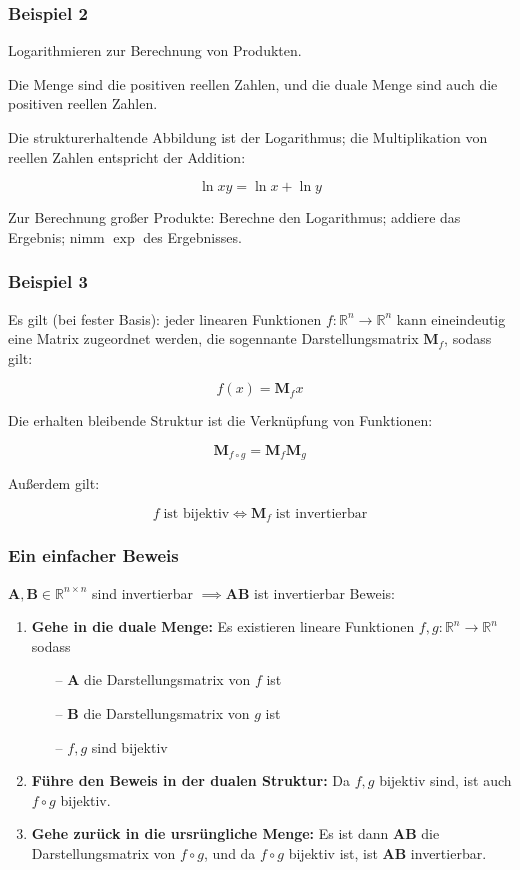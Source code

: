 \documentclass{beamer}
\newcommand{\R}{\mathbb{R}}
\newcommand{\M}{\mathbf{M}}
\newcommand{\A}{\mathbf{A}}
\newcommand{\B}{\mathbf{B}}
\begin{document}
\begin{frame}
\frametitle{Beispiel 2}
Logarithmieren zur Berechnung von Produkten.

Die Menge sind die positiven reellen Zahlen, und die duale Menge sind auch die positiven reellen Zahlen.

Die strukturerhaltende Abbildung ist der Logarithmus; die Multiplikation von reellen Zahlen entspricht der Addition:

$$\ln xy = \ln x + \ln y $$

Zur Berechnung großer Produkte:
Berechne den Logarithmus; addiere das Ergebnis; nimm $\exp$ des Ergebnisses.

\end{frame}

\begin{frame}
\frametitle{Beispiel 3}
Es gilt (bei fester Basis): jeder linearen Funktionen $f: \R^n \to \R^n$ kann eineindeutig eine Matrix zugeordnet werden, die sogennante Darstellungsmatrix $\M_f$, sodass gilt:

$$f(x) = \M_fx$$

Die erhalten bleibende Struktur ist die Verknüpfung von Funktionen:

$$\M_{f \circ g} = \M_f \M_g$$

Außerdem gilt:

$$f \; \text{ist bijektiv} \iff \M_f \; \text{ist invertierbar}$$
\end{frame}

\begin{frame}
\frametitle{Ein einfacher Beweis}
$\A, \B \in \R^{n \times n}$ sind invertierbar $\implies \A \B$ ist invertierbar
\hfill \break
\hfill \break
Beweis:
\begin{enumerate}
  \item \textbf{Gehe in die duale Menge:} \hfill \break
  Es existieren lineare Funktionen $f, g: \R^n \to \R^n$ sodass
  \begin{itemize}
    \item[--] $\A$ die Darstellungsmatrix von $f$ ist
    \item[--] $\B$ die Darstellungsmatrix von $g$ ist
    \item[--] $f, g$ sind bijektiv
  \end{itemize}
  \item \textbf{Führe den Beweis in der dualen Struktur:} \hfill \break
  Da $f, g$ bijektiv sind, ist auch $f \circ g$ bijektiv.
  \item \textbf{Gehe zurück in die ursrüngliche Menge:} \hfill \break
    Es ist dann $\A \B$ die Darstellungsmatrix von $f \circ g$, und da $f \circ g$ bijektiv ist, ist $\A \B$ invertierbar.
\end{enumerate}

\end{frame}
\end{document}
